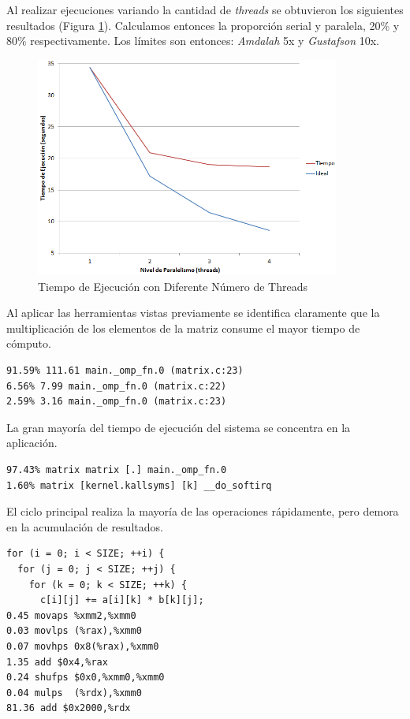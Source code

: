 \documentclass[a4paper]{report}
\begin{document}
Al realizar ejecuciones variando la cantidad de {\it threads} se obtuvieron los siguientes resultados (Figura \ref{fig:matrix-threads}). Calculamos entonces la proporción serial y paralela, 20\% y 80\% respectivamente. Los límites son entonces: {\it Amdalah} 5x y {\it Gustafson} 10x.

\begin{figure}[H]
\centering
\includegraphics[width=10cm]{matrix-threads.png}
\caption{Tiempo de Ejecución con Diferente Número de Threads}
\label{fig:matrix-threads}
\end{figure}

Al aplicar las herramientas vistas previamente se identifica claramente que la multiplicación de los elementos de la matriz consume el mayor tiempo de cómputo. 

\begin{verbatim}
91.59% 111.61 main._omp_fn.0 (matrix.c:23)
6.56% 7.99 main._omp_fn.0 (matrix.c:22)
2.59% 3.16 main._omp_fn.0 (matrix.c:23)
\end{verbatim}

La gran mayoría del tiempo de ejecución del sistema se concentra en la aplicación.

\begin{verbatim}
97.43% matrix matrix [.] main._omp_fn.0
1.60% matrix [kernel.kallsyms] [k] __do_softirq
\end{verbatim}

El ciclo principal realiza la mayoría de las operaciones rápidamente, pero demora en la acumulación de resultados.

\begin{verbatim}
for (i = 0; i < SIZE; ++i) {
  for (j = 0; j < SIZE; ++j) {
    for (k = 0; k < SIZE; ++k) {
      c[i][j] += a[i][k] * b[k][j];
0.45 movaps %xmm2,%xmm0
0.03 movlps (%rax),%xmm0
0.07 movhps 0x8(%rax),%xmm0
1.35 add $0x4,%rax
0.24 shufps $0x0,%xmm0,%xmm0
0.04 mulps  (%rdx),%xmm0
81.36 add $0x2000,%rdx
\end{verbatim}
\end{document}
